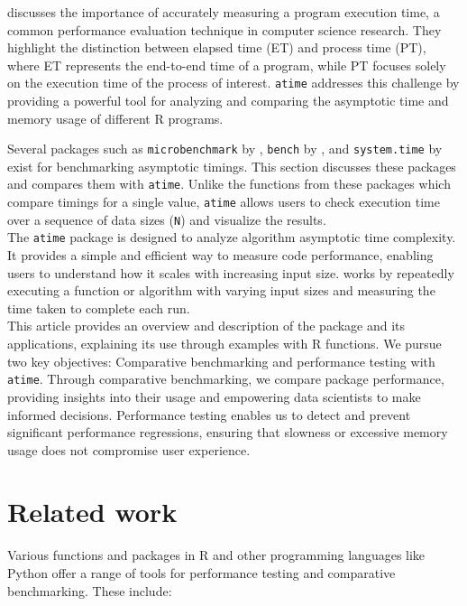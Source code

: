 \noindent \cite{suh2017emp} discusses the importance of accurately measuring a program execution time, a common performance evaluation technique in computer science research. They highlight the distinction between elapsed time (ET) and process time (PT), where ET represents the end-to-end time of a program, while PT focuses solely on the execution time of the process of interest. \texttt{atime} addresses this challenge by providing a powerful tool for analyzing and comparing the asymptotic time and memory usage of different R programs.

\noindent Several packages such as \texttt{microbenchmark} by \cite{microbenchmark}, \texttt{bench} by \cite{bench}, and \texttt{system.time} by \cite{system.time} exist for benchmarking asymptotic timings. This section discusses these packages and compares them with \texttt{atime}. Unlike the functions from these packages which compare timings for a single value, \texttt{atime} allows users to check execution time over a sequence of data sizes (\texttt{N}) and visualize the results.
\\ 
 
\noindent The \texttt{atime} package is designed to analyze algorithm asymptotic time complexity. It provides a simple and efficient way to measure code performance, enabling users to understand how it scales with increasing input size.  works by repeatedly executing a function or algorithm with varying input sizes and measuring the time taken to complete each run. \\

\noindent This article provides an overview and description of the package and its applications, explaining its use through examples with R functions. We pursue two key objectives: Comparative benchmarking and performance testing with \texttt{atime}. Through comparative benchmarking, we compare package performance, providing insights into their usage and empowering data scientists to make informed decisions. Performance testing enables us to detect and prevent significant performance regressions, ensuring that slowness or excessive memory usage does not compromise user experience.\\

\section{Related work}

\noindent Various functions and packages in R and other programming languages like Python offer a range of tools for performance testing and comparative benchmarking. These include: 
\\

